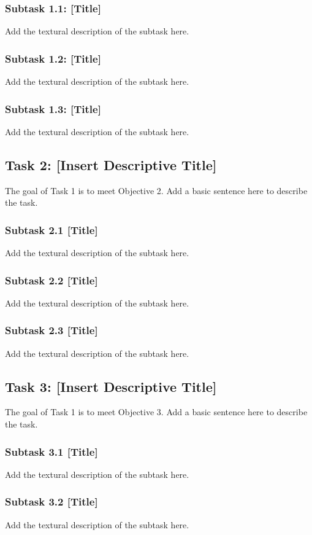 \documentclass[11pt,letterpaper]{article}
\begin{document}
{\subsubsection*{Subtask 1.1: [Title]}
Add the textural description of the subtask here.
\subsubsection*{Subtask 1.2: [Title]}
Add the textural description of the subtask here.
\subsubsection*{Subtask 1.3: [Title]}
Add the textural description of the subtask here.

\subsection{Task 2: [Insert Descriptive Title]}
The goal of Task 1 is to meet Objective 2. Add a basic sentence here to describe the task.
\subsubsection*{Subtask 2.1 [Title]}
Add the textural description of the subtask here.
\subsubsection*{Subtask 2.2 [Title]}
Add the textural description of the subtask here.
\subsubsection*{Subtask 2.3 [Title]}
Add the textural description of the subtask here.

\subsection{Task 3: [Insert Descriptive Title]}
The goal of Task 1 is to meet Objective 3. Add a basic sentence here to describe the task.
\subsubsection*{Subtask 3.1 [Title]}
Add the textural description of the subtask here.
\subsubsection*{Subtask 3.2 [Title]}
Add the textural description of the subtask here.
}
\end{document}
